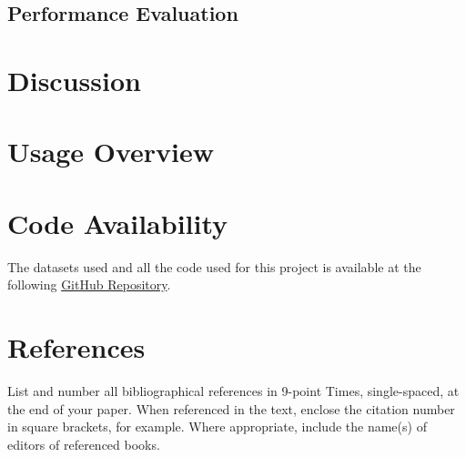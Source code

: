 \documentclass[10pt,twocolumn,letterpaper]{article}
\begin{document}
\subsection{Performance Evaluation}

\section{Discussion}

\section{Usage Overview}

\section{Code Availability}
The datasets used and all the code used for this project is available
at the following \href{https://github.com/marcouderzo/BioData-ProteinFunctionPrediction}{GitHub Repository}.



\section{References}

List and number all bibliographical references in 9-point Times,
single-spaced, at the end of your paper. When referenced in the text,
enclose the citation number in square brackets, for
example.  Where appropriate, include the name(s) of
editors of referenced books.

%
%
\end{document}
